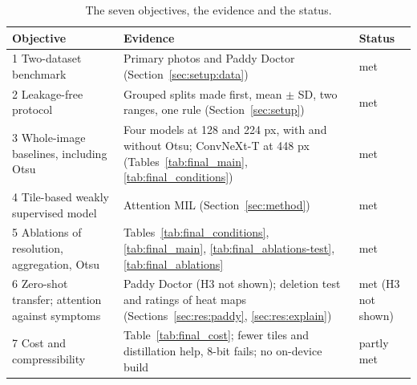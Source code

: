 \begin{table}[t]
\caption{The seven objectives, the evidence and the status.}
\label{tab:objectives}
\centering
\scriptsize
\renewcommand{\arraystretch}{1.1}
\begin{tabular}{@{}L{3.1cm}L{3.5cm}L{1.1cm}@{}}
\toprule
Objective & Evidence & Status \\
 Two-dataset benchmark & Primary photos and Paddy Doctor (Section~\ref{sec:setup:data}) & met \\
2 Leakage-free protocol & Grouped splits made first, mean $\pm$ SD, two ranges, one rule (Section~\ref{sec:setup}) & met \\
3 Whole-image baselines, including Otsu & Four models at 128 and 224 px, with and without Otsu; ConvNeXt-T at 448 px (Tables~\ref{tab:final_main}, \ref{tab:final_conditions}) & met \\
4 Tile-based weakly supervised model & Attention MIL (Section~\ref{sec:method}) & met \\
5 Ablations of resolution, aggregation, Otsu & Tables~\ref{tab:final_conditions}, \ref{tab:final_main}, \ref{tab:final_ablations-test}, \ref{tab:final_ablations} & met \\
6 Zero-shot transfer; attention against symptoms & Paddy Doctor (H3 not shown); deletion test and ratings of heat maps (Sections~\ref{sec:res:paddy}, \ref{sec:res:explain}) & met (H3 not shown) \\
7 Cost and compressibility & Table~\ref{tab:final_cost}; fewer tiles and distillation help, 8-bit fails; no on-device build & partly met \\
\bottomrule
\end{tabular}
\end{table}
